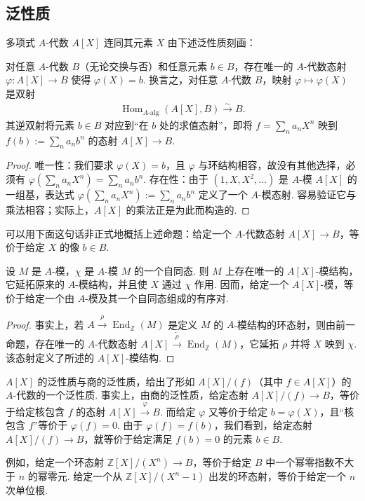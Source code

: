 \subsection{泛性质}\label{sec:galois-1-4-2}
多项式 $A$-代数 $A[X]$ 连同其元素 $X$ 由下述泛性质刻画：
\begin{proposition*}
对任意 $A$-代数 $B$（无论交换与否）和任意元素 $b\in B$，存在唯一的 $A$-代数态射 $\varphi\colon A[X]\longrightarrow B$ 使得 $\varphi(X)=b$. 换言之，对任意 $A$-代数 $B$，映射 $\varphi\longmapsto\varphi(X)$ 是双射
\begin{align*}
\operatorname{Hom}_{A\text{-}\mathrm{alg}}(A[X],B)\xrightarrow{\sim}B.
\end{align*}
其逆双射将元素 $b\in B$ 对应到``在 $b$ 处的求值态射''，即将 $f=\sum_n a_nX^n$ 映到 $f(b):=\sum_n a_nb^n$ 的态射 $A[X]\longrightarrow B$.
\end{proposition*}
\begin{proof}
唯一性：我们要求 $\varphi(X)=b$，且 $\varphi$ 与环结构相容，故没有其他选择，必须有 $\varphi(\sum_n a_nX^n)=\sum_n a_nb^n$.
存在性：由于 $(1,X,X^2,\ldots)$ 是 $A$-模 $A[X]$ 的一组基，表达式 $\varphi(\sum_n a_nX^n):=\sum_n a_nb^n$ 定义了一个 $A$-模态射. 容易验证它与乘法相容；实际上，$A[X]$ 的乘法正是为此而构造的.
\end{proof}
可以用下面这句话非正式地概括上述命题：给定一个 $A$-代数态射 $A[X]\longrightarrow B$，等价于给定 $X$ 的像 $b\in B$.
\begin{corollary*}
设 $M$ 是 $A$-模，$\chi$ 是 $A$-模 $M$ 的一个自同态. 则 $M$ 上存在唯一的 $A[X]$-模结构，它延拓原来的 $A$-模结构，并且使 $X$ 通过 $\chi$ 作用. 因而，给定一个 $A[X]$-模，等价于给定一个由 $A$-模及其一个自同态组成的有序对.
\end{corollary*}
\begin{proof}
事实上，若 $A\xrightarrow{\rho}\operatorname{End}_{\mathbb Z}(M)$ 是定义 $M$ 的 $A$-模结构的环态射，则由前一命题，存在唯一的 $A$-代数态射 $A[X]\xrightarrow{\widetilde\rho}\operatorname{End}_{\mathbb Z}(M)$，它延拓 $\rho$ 并将 $X$ 映到 $\chi$. 该态射定义了所述的 $A[X]$-模结构.
\end{proof}
\begin{remark*}
$A[X]$ 的泛性质与商的泛性质，给出了形如 $A[X]/(f)$（其中 $f\in A[X]$）的 $A$-代数的一个泛性质. 事实上，由商的泛性质，给定态射 $A[X]/(f)\longrightarrow B$，等价于给定核包含 $f$ 的态射 $A[X]\xrightarrow{\varphi}B$. 而给定 $\varphi$ 又等价于给定 $b=\varphi(X)$，且``核包含 $f$''等价于 $\varphi(f)=0$. 由于 $\varphi(f)=f(b)$，我们看到，给定态射 $A[X]/(f)\longrightarrow B$，就等价于给定满足 $f(b)=0$ 的元素 $b\in B$.

例如，给定一个环态射 $\mathbb Z[X]/(X^n)\longrightarrow B$，等价于给定 $B$ 中一个幂零指数不大于 $n$ 的幂零元. 给定一个从 $\mathbb Z[X]/(X^n-1)$ 出发的环态射，等价于给定一个 $n$ 次单位根.
\end{remark*}


